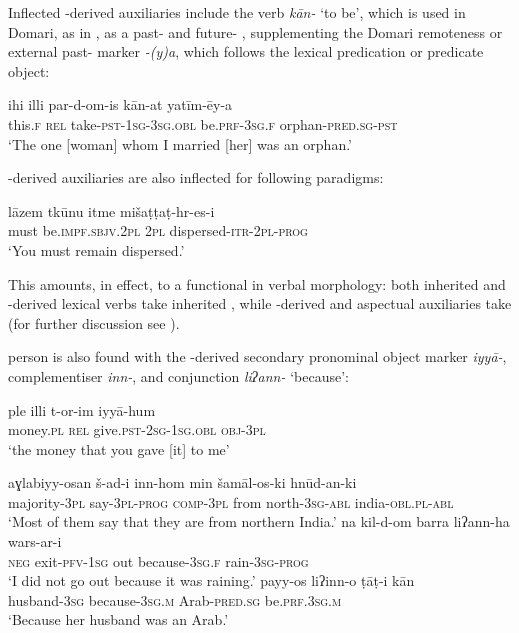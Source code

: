 \documentclass[output=paper]{langsci/langscibook}
\begin{document}
Inflected -derived auxiliaries include the  verb \textit{kān-} ‘to be’, which is used in Domari, as in , as a past- and future- , supplementing the Domari remoteness or external past- marker \textit{-(y)a}, which follows the lexical predication or predicate object:

\ea \gll ihi illi par-d-om-is kān-at yatīm-ēy-a\\
     this.\textsc{f} \textsc{rel} take-\textsc{pst-1sg-3sg.obl} be.\textsc{prf-3sg.f} orphan-\textsc{pred.sg-pst}\\
\glt ‘The one [woman] whom I married [her] was an orphan.’ \label{ihi}
\z

\noindent {}-derived auxiliaries are also inflected for  following  paradigms:

\ea \gll   lāzem tkūnu itme mišaṭṭaṭ-hr-es-i\\
       must be.\textsc{impf.sbjv.2pl} \textsc{2pl} dispersed-\textsc{itr-2pl-prog}\\
\glt   ‘You must remain dispersed.’
\z

This amounts, in effect, to a functional  in verbal morphology: both inherited and -derived lexical verbs take inherited  , while -derived  and aspectual auxiliaries take   (for further discussion see \citealt{Matras2015}).

 person  is also found with the -derived secondary pronominal object marker \textit{iyyā-}, complementiser \textit{inn-}, and conjunction \textit{liʔann-} ‘because’:

\ea \gll   ple illi t-or-im iyyā-hum\\
       money.\textsc{pl} \textsc{rel} give.\textsc{pst-2sg-1sg.obl} \textsc{obj-3pl}\\
\glt   ‘the money that you gave [it] to me’ \label{ple}
\z

\ea\label{most}
\gll aɣlabiyy-osan š-ad-i inn-hom min šamāl-os-ki hnūd-an-ki\\
     majority-\textsc{3pl} say-\textsc{3pl-prog} \textsc{comp-3pl} from        north-\textsc{3sg-abl} india-\textsc{obl.pl-abl}\\
\glt   ‘Most of them say that they are from northern India.’
\ex \gll na kil-d-om barra liʔann-ha wars-ar-i\\
       \textsc{neg} exit-\textsc{pfv-1sg} out because-\textsc{3sg.f} rain-\textsc{3sg-prog}\\
\glt   ‘I did not go out because it was raining.’\label{barra}
\ex \gll     payy-os liʔinn-o ṭāṭ-i kān\\
       husband-\textsc{3sg} because-\textsc{3sg.m} Arab-\textsc{pred.sg} be.\textsc{prf.3sg.m}\\
\glt   ‘Because her husband was an Arab.’
\z
\end{document}
